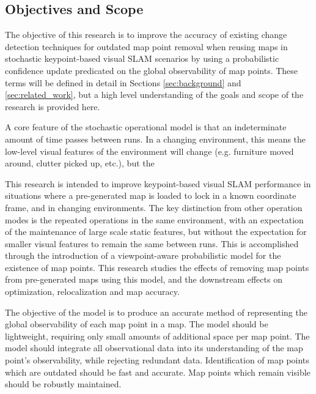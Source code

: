 \subsection{Objectives and Scope}
\label{objectives}

The objective of this research is to improve the accuracy of existing change detection techniques for outdated map point removal when reusing maps in stochastic keypoint-based visual SLAM scenarios by using a probabilistic confidence update predicated on the global observability of map points. These terms will be defined in detail in Sections \ref{sec:background} and \ref{sec:related_work}, but a high level understanding of the goals and scope of the research is provided here.

A core feature of the stochastic operational model is that an indeterminate amount of time passes between runs. In a changing environment, this means the low-level visual features of the environment will change (e.g. furniture moved around, clutter picked up, etc.), but the 




This research is intended to improve keypoint-based visual SLAM performance in situations where a pre-generated map is loaded to lock in a known coordinate frame, and in changing environments. The key distinction from other operation modes is the repeated operations in the same environment, with an expectation of the maintenance of large scale static features, but without the expectation for smaller visual features to remain the same between runs. This is accomplished through the introduction of a viewpoint-aware probabilistic model for the existence of map points. This research studies the effects of removing map points from pre-generated maps using this model, and the downstream effects on optimization, relocalization and map accuracy.


The objective of the model is to produce an accurate method of representing the global observability of each map point in a map. The model should be lightweight, requiring only small amounts of additional space per map point. The model should integrate all observational data into its understanding of the map point's observability, while rejecting redundant data. Identification of map points which are outdated should be fast and accurate. Map points which remain visible should be robustly maintained.

